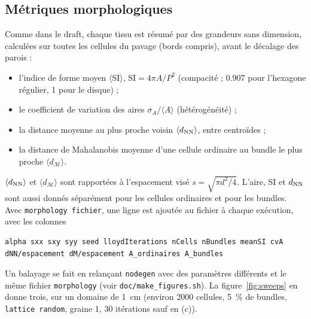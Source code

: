 \documentclass[11pt,a4paper]{article}
\newcommand{\code}[1]{\texttt{#1}}
\newcommand{\toolgen}{\code{nodegen}}
\begin{document}
\subsection{Métriques morphologiques}
\label{sec:metrics}

Comme dans le draft, chaque tissu est résumé par des grandeurs sans dimension, calculées sur toutes les cellules
du pavage (bords compris), avant le décalage des parois :
\begin{itemize}[nosep]
  \item l'indice de forme moyen $\langle\mathrm{SI}\rangle$, $\mathrm{SI}=4\pi A/P^2$ (compacité ; 0.907 pour
    l'hexagone régulier, 1 pour le disque) ;
  \item le coefficient de variation des aires $\sigma_A/\langle A\rangle$ (hétérogénéité) ;
  \item la distance moyenne au plus proche voisin $\langle d_{\rm NN}\rangle$, entre centroïdes ;
  \item la distance de Mahalanobis moyenne d'une cellule ordinaire au bundle le plus proche
    $\langle d_{\mathcal M}\rangle$.
\end{itemize}
$\langle d_{\rm NN}\rangle$ et $\langle d_{\mathcal M}\rangle$ sont rapportées à l'espacement visé
$s=\sqrt{\pi d^2/4}$. L'aire, SI et $d_{\rm NN}$ sont aussi donnés séparément pour les cellules ordinaires et pour
les bundles. Avec \code{morphology fichier}, une ligne est ajoutée au fichier à chaque exécution, avec les colonnes
\begin{lstlisting}
alpha sxx sxy syy seed lloydIterations nCells nBundles meanSI cvA dNN/espacement dM/espacement A_ordinaires A_bundles
\end{lstlisting}
Un balayage se fait en relançant \toolgen{} avec des paramètres différents et le même fichier \code{morphology}
(voir \code{doc/make\_figures.sh}). La figure~\ref{fig:sweeps} en donne trois, sur un domaine de \SI{1}{cm}
(environ 2000 cellules, \SI{5}{\%} de bundles, \code{lattice random}, graine 1, 30 itérations sauf en (c)).
\end{document}
